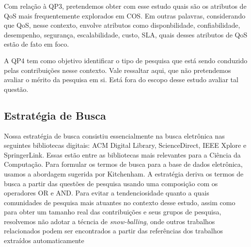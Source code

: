 Com rela\c{c}\~{a}o \`{a} QP3, pretendemos obter com esse estudo quais s\~{a}o os atributos de QoS mais frequentemente explorados em COS. Em outras palavras, considerando que QoS, nesse contexto, envolve atributos como disponbilidade, confiabilidade, desempenho, seguran\c{c}a, escalabilidade, custo, SLA, quais desses atributos de QoS est\~{a}o de fato em foco.

A QP4 tem como objetivo identificar o tipo de pesquisa que est\'{a} sendo conduzido pelas contribui\c{c}\~{o}es nesse contexto. Vale ressaltar aqui, que n\~{a}o pretendemos avaliar o m\'{e}rito da pesquisa em si. Est\'{a} fora do escopo desse estudo avaliar tal quest\~{a}o.

\subsection{Estrat\'{e}gia de Busca}
Nossa estrat\'{e}gia de busca consistiu essencialmente na busca eletr\^{o}nica nas seguintes bibliotecas digitais: ACM Digital Library, ScienceDirect, IEEE Xplore e SpringerLink. Essas est\~ao entre as bibliotecas mais relevantes para a Ci\^{e}ncia da Computa\c{c}\~ao. Para formular os termos de busca para a base de dados eletr\^{o}nica, usamos a abordagem sugerida por Kitchenham\cite{Barbara Kitchenham}. A estrat\'{e}gia deriva os termos de busca a partir das quest\~{o}es de pesquisa  usando uma composi\c{c}\~{a}o com os operadores OR e AND. Para evitar a tendenciosidade quanto a quais comunidades de pesquisa mais atuantes no contexto desse estudo, assim como para obter um tamanho real das contribui\c{c}\~{o}es e seus grupos de pesquisa, resolvemos n\~ao adotar a t\'{e}cncia de \emph{snow-balling}, onde outros trabalhos relacionados podem ser encontrados a partir das refer\^{e}ncias dos trabalhos extraídos automaticamente \cite{VIDE Using Mapping Studies in Software Engineering (Proc. of PPIG 2008}

